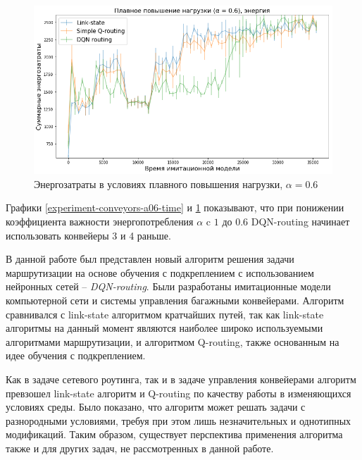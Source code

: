 \documentclass[specification, annotation]{itmo-student-thesis}
\begin{document}
\begin{figure}[!h]
  \caption{Энергозатраты в условиях плавного повышения нагрузки, $\alpha =
    0.6$}\label{experiment-conveyors-a06-energy}
  \centering
  \includegraphics[scale=0.6]{experiment-conveyors-a06-energy}
\end{figure}

Графики \ref{experiment-conveyors-a06-time} и
\ref{experiment-conveyors-a06-energy} показывают, что при понижении коэффициента
важности энергопотребления $\alpha$ c $1$ до $0.6$ DQN-routing начинает
использовать конвейеры 3 и 4 раньше.

\startconclusionpage

В данной работе был представлен новый алгоритм решения задачи маршрутизации на основе
обучения с подкреплением с использованием нейронных сетей --
\textit{DQN-routing}. Были разработаны имитационные модели компьютерной сети и
системы управления багажными конвейерами. Алгоритм сравнивался с link-state
алгоритмом кратчайших путей, так как link-state алгоритмы на данный момент
являются наиболее широко используемыми алгоритмами маршрутизации, и алгоритмом
Q-routing, также основанным на идее обучения с подкреплением.

Как в задаче сетевого роутинга, так и в задаче управления конвейерами алгоритм
превзошел link-state алгоритм и Q-routing по качеству работы в изменяющихся
условиях среды. Было показано, что алгоритм может решать задачи с разнородными
условиями, требуя при этом лишь незначительных и однотипных модификаций.
Таким образом, существует перспектива применения алгоритма также и для других
задач, не рассмотренных в данной работе.

\printmainbibliography

\appendix
\end{document}

